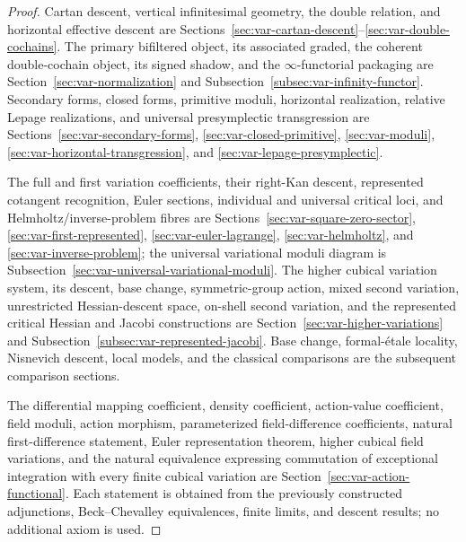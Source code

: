 \begin{proof}
Cartan descent, vertical infinitesimal geometry, the double relation, and horizontal effective descent are Sections~\ref{sec:var-cartan-descent}--\ref{sec:var-double-cochains}. The primary bifiltered object, its associated graded, the coherent double-cochain object, its signed shadow, and the \(\infty\)-functorial packaging are Section~\ref{sec:var-normalization} and Subsection~\ref{subsec:var-infinity-functor}. Secondary forms, closed forms, primitive moduli, horizontal realization, relative Lepage realizations, and universal presymplectic transgression are Sections~\ref{sec:var-secondary-forms}, \ref{sec:var-closed-primitive}, \ref{sec:var-moduli}, \ref{sec:var-horizontal-transgression}, and \ref{sec:var-lepage-presymplectic}.

The full and first variation coefficients, their right-Kan descent, represented cotangent recognition, Euler sections, individual and universal critical loci, and Helmholtz/inverse-problem fibres are Sections~\ref{sec:var-square-zero-sector}, \ref{sec:var-first-represented}, \ref{sec:var-euler-lagrange}, \ref{sec:var-helmholtz}, and \ref{sec:var-inverse-problem}; the universal variational moduli diagram is Subsection~\ref{sec:var-universal-variational-moduli}. The higher cubical variation system, its descent, base change, symmetric-group action, mixed second variation, unrestricted Hessian-descent space, on-shell second variation, and the represented critical Hessian and Jacobi constructions are Section~\ref{sec:var-higher-variations} and Subsection~\ref{subsec:var-represented-jacobi}. Base change, formal-\'etale locality, Nisnevich descent, local models, and the classical comparisons are the subsequent comparison sections.

The differential mapping coefficient, density coefficient, action-value coefficient, field moduli, action morphism, parameterized field-difference coefficients, natural first-difference statement, Euler representation theorem, higher cubical field variations, and the natural equivalence expressing commutation of exceptional integration with every finite cubical variation are Section~\ref{sec:var-action-functional}. Each statement is obtained from the previously constructed adjunctions, Beck--Chevalley equivalences, finite limits, and descent results; no additional axiom is used.
\end{proof}

